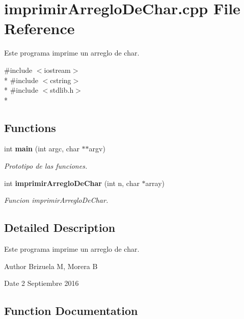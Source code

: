 \section{imprimir\-Arreglo\-De\-Char.\-cpp File Reference}
\label{imprimir_arreglo_de_char_8cpp}


Este programa imprime un arreglo de char.  


{\ttfamily \#include $<$iostream$>$}\\*
{\ttfamily \#include $<$cstring$>$}\\*
{\ttfamily \#include $<$stdlib.\-h$>$}\\*
\subsection*{Functions}
\begin{DoxyCompactItemize}
\item 
int {\bf main} (int argc, char $\ast$$\ast$argv)
\begin{DoxyCompactList}\small\item\em Prototipo de las funciones. \end{DoxyCompactList}\item 
int {\bf imprimir\-Arreglo\-De\-Char} (int n, char $\ast$array)
\begin{DoxyCompactList}\small\item\em Funcion imprimir\-Arreglo\-De\-Char. \end{DoxyCompactList}\end{DoxyCompactItemize}


\subsection{Detailed Description}
Este programa imprime un arreglo de char. \begin{DoxyAuthor}{Author}
Brizuela M, Morera B 
\end{DoxyAuthor}
\begin{DoxyDate}{Date}
2 Septiembre 2016 
\end{DoxyDate}


\subsection{Function Documentation}
